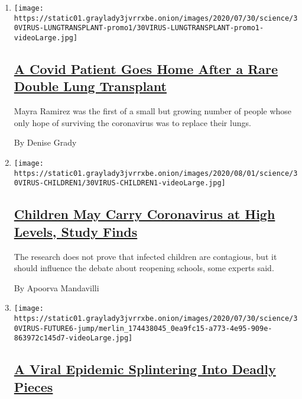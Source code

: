 \begin{enumerate}
\def\labelenumi{\arabic{enumi}.}
\item
  \texttt{[image: https://static01.graylady3jvrrxbe.onion/images/2020/07/30/science/30VIRUS-LUNGTRANSPLANT-promo1/30VIRUS-LUNGTRANSPLANT-promo1-videoLarge.jpg]}

  \hypertarget{a-covid-patient-goes-home-after-a-rare-double-lung-transplant}{%
  \subsection{\texorpdfstring{\href{/2020/07/30/health/Covid-lung-transplant.html}{A
  Covid Patient Goes Home After a Rare Double Lung
  Transplant}}{A Covid Patient Goes Home After a Rare Double Lung Transplant}}\label{a-covid-patient-goes-home-after-a-rare-double-lung-transplant}}

  Mayra Ramirez was the first of a small but growing number of people
  whose only hope of surviving the coronavirus was to replace their
  lungs.

  By Denise Grady
\item
  \texttt{[image: https://static01.graylady3jvrrxbe.onion/images/2020/08/01/science/30VIRUS-CHILDREN1/30VIRUS-CHILDREN1-videoLarge.jpg]}

  \hypertarget{children-may-carry-coronavirus-at-high-levels-study-finds}{%
  \subsection{\texorpdfstring{\href{/2020/07/30/health/coronavirus-children.html}{Children
  May Carry Coronavirus at High Levels, Study
  Finds}}{Children May Carry Coronavirus at High Levels, Study Finds}}\label{children-may-carry-coronavirus-at-high-levels-study-finds}}

  The research does not prove that infected children are contagious, but
  it should influence the debate about reopening schools, some experts
  said.

  By Apoorva Mandavilli
\item
  \texttt{[image: https://static01.graylady3jvrrxbe.onion/images/2020/07/30/science/30VIRUS-FUTURE6-jump/merlin\_174438045\_0ea9fc15-a773-4e95-909e-863972c145d7-videoLarge.jpg]}

  \hypertarget{a-viral-epidemic-splintering-into-deadly-pieces}{%
  \subsection{\texorpdfstring{\href{/2020/07/29/health/coronavirus-future-america.html}{A
  Viral Epidemic Splintering Into Deadly
  Pieces}}{A Viral Epidemic Splintering Into Deadly Pieces}}\label{a-viral-epidemic-splintering-into-deadly-pieces}}


\end{enumerate}
